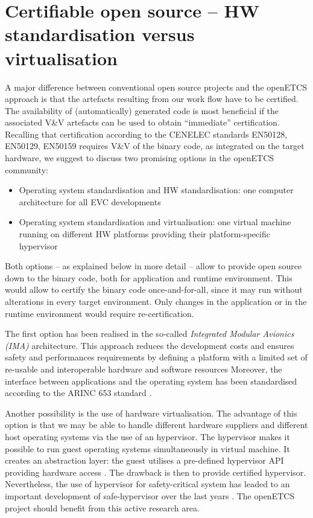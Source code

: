 \documentclass[11pt, a4paper]{article}
\begin{document}
\section{Certifiable open source -- HW standardisation versus virtualisation}
\label{sec:virtual}
A major difference between conventional open source projects and the openETCS approach is 
that the artefacts resulting from our work flow have to be certified. The availability of
(automatically) generated code is most beneficial if the associated V\&V artefacts can be used to obtain 
``immediate'' certification. Recalling that certification according to the
CENELEC standards EN50128, EN50129, EN50159 \cite{EN50129,EN50128,EN50159-1,
EN50159-2} requires V\&V of the binary
code, as integrated on the target hardware, we suggest to discuss two promising
options in the openETCS community:
\begin{itemize}
\item Operating system standardisation and HW standardisation: one computer architecture for all EVC developments 
\item Operating system standardisation and virtualisation: one virtual machine
running on different HW platforms providing their platform-specific hypervisor
\end{itemize}
Both options -- as explained below in more detail -- allow to provide open source
down to the binary code, both for  application and runtime environment. This would
allow to certify the binary code once-and-for-all, since it may run without
alterations in every target environment. Only changes in the application or in
the runtime environment would require re-certification.



The first option has been realised in the so-called  {\it Integrated Modular Avionics (IMA)} 
architecture. This approach reduces the development costs and
ensures safety and performances requirements by defining a platform with
a limited set of re-usable and interoperable hardware and software resources
Moreover, the interface between applications and the operating system has been standardised according to  the ARINC 653 standard  \cite{ARINC653P1-2}.



Another possibility is the use of hardware virtualisation. The advantage of this option is that
we may be able to handle different hardware suppliers and  different host operating
systems via the use of an hypervisor. The hypervisor makes it possible to run guest
operating systems simultaneously in virtual machine. It creates an abstraction
layer: the guest utilises a pre-defined hypervisor API  providing hardware
access \cite{tanenbaum2008}. 
The drawback is then to provide certified hypervisor. Nevertheless, the use of
hypervisor for safety-critical system has leaded to an important development of
safe-hypervisor over the last years
\cite{1629596,Garfinkel:2003:TVM:945445.945464,Wang:2010:HLA:1849417.1849986}. The openETCS project should benefit from
this active research area.
\end{document}
